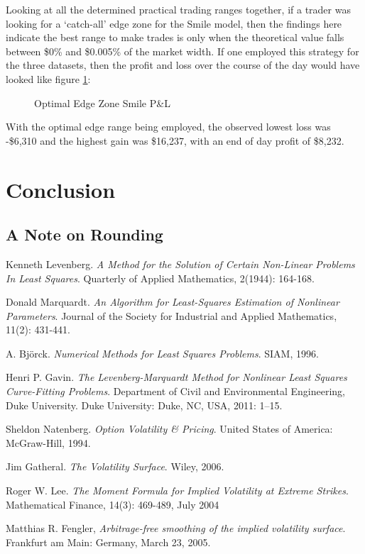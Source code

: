\documentclass[12pt, a4paper, notitlepage]{article}
\numberwithin{equation}{subsection}
\numberwithin{figure}{subsection}
\numberwithin{table}{subsection}
\newcommand{\img}[3]
{
    \begin{figure}[H]
	\caption{#1}
	\centerline{\fbox{\texttt{[image: \#2]}}}
	\label{#3}
    \end{figure}
}
\begin{document}
Looking at all the determined practical trading ranges together, if a trader was looking for a `catch-all' edge zone for the Smile model, then the findings here indicate the best range to make trades is only when the theoretical value falls between \$0\% and \$0.005\% of the market width.  If one employed this strategy for the three datasets, then the profit and loss over the course of the day would have looked like figure \ref{fig:SmileOptimalPnL}:

\img{Optimal Edge Zone Smile P\&L}{SmileOptimalPnL}{fig:SmileOptimalPnL}

With the optimal edge range being employed, the observed lowest loss was -\$6,310 and the highest gain was \$16,237, with an end of day profit of \$8,232.

\newpage
\section{Conclusion} \label{sec:DiscussionAndConclusion}

\subsection{A Note on Rounding}

\newpage
\begin{thebibliography}{3}
	
    	Kenneth Levenberg.
        \textit{A Method for the Solution of Certain Non-Linear Problems In Least Squares}.
        Quarterly of Applied Mathematics, 2(1944): 164-168.
    
    	Donald Marquardt.
        \textit{An Algorithm for Least-Squares Estimation of Nonlinear Parameters}.  Journal of the Society for Industrial and Applied Mathematics, 11(2): 431-441.
    
        A. Bj\"orck.  \textit{Numerical Methods for Least Squares Problems}.
        SIAM, 1996.
        
        Henri P. Gavin.
        \textit{The Levenberg-Marquardt Method for Nonlinear Least Squares Curve-Fitting Problems}.
        Department of Civil and Environmental Engineering, Duke University.
        Duke University: Duke, NC, USA, 2011: 1–15.
    
    	Sheldon Natenberg.
        \textit{Option Volatility \& Pricing}.
        United States of America:  McGraw-Hill, 1994.
    
    	Jim Gatheral.
        \textit{The Volatility Surface}.
        Wiley, 2006.
    
    	Roger W. Lee.
        \textit{The Moment Formula for Implied Volatility at Extreme Strikes}.
        Mathematical Finance, 14(3): 469-489, July 2004
    
	  Matthias R. Fengler,
	  \textit{Arbitrage-free smoothing of the implied volatility surface}.
	  Frankfurt am Main: Germany,
	  March 23, 2005.
	  

\end{thebibliography}
\end{document}
